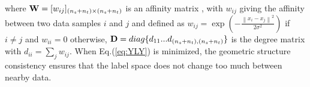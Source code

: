 \documentclass[journal,twocolumn]{IEEEtran}
\begin{document}
\begin{CJK*}{UTF8}{gkai}
where  ${\bf{W}} = {[{w_{ij}}]_{({n_s} + {n_t}) \times ({n_s} + {n_t})}}$ is an affinity matrix \cite{NIPS2001_2092}, with   ${w_{ij}}$ giving the affinity between two data samples $i$ and $j$ and  defined as ${w_{ij}} = \exp ( - \frac{{{{\left\| {{x_i} - {x_j}} \right\|}^2}}}{{2{\sigma ^2}}})$ if $i \ne j$ and ${w_{ii}} = 0$ otherwise, ${\bf{D}} = diag\{ {d_{11}}...{d_{({n_s} + {n_t}),({n_s} + {n_t})}}\} $ is the degree matrix with ${d_{ii}} = \sum\nolimits_j {{w_{ij}}} $. When Eq.(\ref{eq:YLY}) is minimized, the geometric structure consistency ensures that the label space does not change too much between nearby data.
























\end{CJK*}
\end{document}
